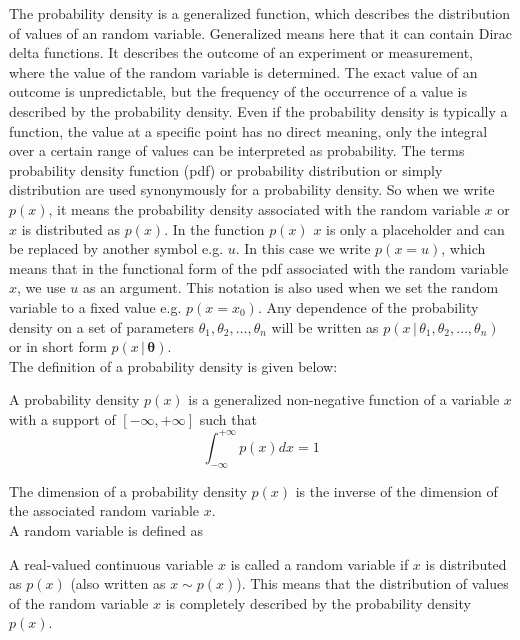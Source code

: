 \documentclass{tstextbook}
\begin{document}
The probability density is a generalized function, which describes the distribution of values of an random variable. Generalized means here that it can contain Dirac delta functions. It describes the outcome of an experiment or measurement, where the value of the random variable is determined. The exact value of an outcome is unpredictable, but the frequency of the occurrence of a value is described by the probability density. Even if the probability density is typically a function, the value at a specific point has no direct meaning, only the integral over a certain range of values can be interpreted as probability. The terms probability density function (pdf) or probability distribution or simply distribution are used synonymously for a probability density. So when we write $p(x)$, it means the probability density associated with the random variable $x$ or $x$ is distributed as $p(x)$. In the function $p(x)$ $x$ is only a placeholder and can be replaced by another symbol e.g. $u$. In this case we write $p(x=u)$, which means that in the functional form of the pdf associated with the random variable $x$, we use $u$ as an argument. This notation is also used when we set the random variable to a fixed value e.g. $p(x=x_0)$. Any dependence of the probability density on a set of parameters $\theta_1,\theta_2,\ldots,\theta_n$ will be written as 
$p(x\,\vert\,\theta_1,\theta_2,\ldots,\theta_n)$ or in short form $p(x\,\vert\,\boldsymbol{\theta})$.\\  

The definition of a probability density is given below:

\begin{definition}
  \label{th:probabilitydensity}
  A probability density $p(x)$ is a generalized non-negative function of a variable
  $x$ with a support of $[-\infty,+\infty]$ such that
  \begin{equation}
    \int_{-\infty}^{+\infty}p(x)dx=1
  \end{equation}
\end{definition}
The dimension of a probability density $p(x)$ is the inverse of the dimension of the associated random variable $x$.\\

A random variable is defined as
\begin{definition}
  \label{th:randomvariable}
  A real-valued continuous variable $x$ is called a random variable if $x$ is distributed as $p(x)$ (also written as $x\sim p(x)$). This means that the distribution of values of the random variable $x$ is completely described by the probability density $p(x)$.
\end{definition}
\end{document}
